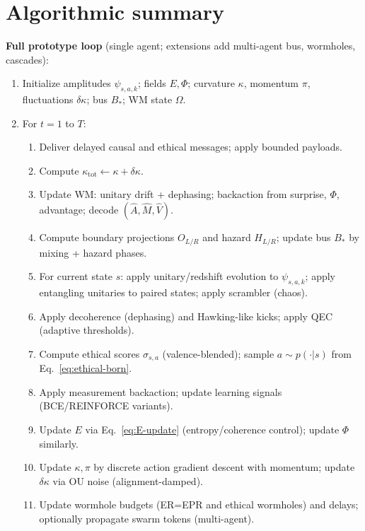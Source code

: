 \documentclass[11pt]{article}
\begin{document}
\section{Algorithmic summary}
\textbf{Full prototype loop} (single agent; extensions add multi-agent bus, wormholes, cascades):
\begin{enumerate}
\item Initialize amplitudes $\psi_{s,a,k}$; fields $E,\Phi$; curvature $\kappa$, momentum $\pi$, fluctuations $\delta\kappa$; bus $B_{\ast}$; WM state $\Omega$.
\item For $t=1$ to $T$:
\begin{enumerate}
\item Deliver delayed causal and ethical messages; apply bounded payloads.
\item Compute $\kappa_{\mathrm{tot}} \gets \kappa + \delta\kappa$.
\item Update WM: unitary drift + dephasing; backaction from surprise, $\Phi$, advantage; decode $(\hat A,\hat M,\hat V)$.
\item Compute boundary projections $O_{L/R}$ and hazard $H_{L/R}$; update bus $B_{\ast}$ by mixing + hazard phases.
\item For current state $s$: apply unitary/redshift evolution to $\psi_{s,a,k}$; apply entangling unitaries to paired states; apply scrambler (chaos).
\item Apply decoherence (dephasing) and Hawking-like kicks; apply QEC (adaptive thresholds).
\item Compute ethical scores $\sigma_{s,a}$ (valence-blended); sample $a\sim p(\cdot|s)$ from Eq.~\eqref{eq:ethical-born}.
\item Apply measurement backaction; update learning signals (BCE/REINFORCE variants).
\item Update $E$ via Eq.~\eqref{eq:E-update} (entropy/coherence control); update $\Phi$ similarly.
\item Update $\kappa,\pi$ by discrete action gradient descent with momentum; update $\delta\kappa$ via OU noise (alignment-damped).
\item Update wormhole budgets (ER=EPR and ethical wormholes) and delays; optionally propagate swarm tokens (multi-agent).
\end{enumerate}
\end{enumerate}
\end{document}
